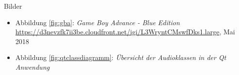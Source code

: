 \documentclass[11pt,a4paper]{scrartcl}
\begin{document}
\vspace{1cm}

\huge Bilder
\normalsize

\begin{itemize}
    \item Abbildung \ref{fig:gba}: \textit{Game Boy Advance - Blue Edition}\newline
    \url{https://d3nevzfk7ii3be.cloudfront.net/igi/L3WryntCMswfDks1.large}, Mai 2018
\end{itemize}

\begin{itemize}
    \item Abbildung \ref{fig:qtclassdiagramm}: \textit{\"Ubersicht der Audioklassen in der Qt Anwendung}
\end{itemize}
\end{document}
